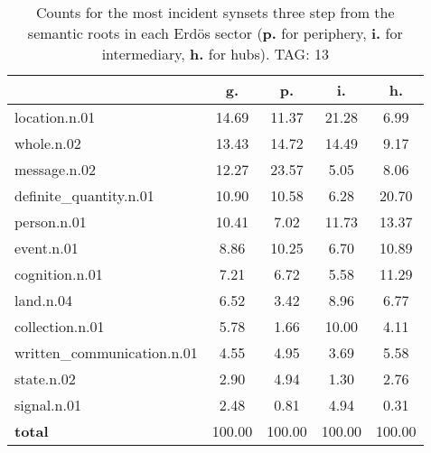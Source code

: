 \begin{table}[h!]
\begin{center}
\begin{tabular}{| l || c | c | c | c |}\hline
 & {\bf g.} & {\bf p.} & {\bf i.} & {\bf h.} \\\hline\hline
location.n.01 & 14.69  & 11.37  & 21.28  & 6.99 \\\hline
whole.n.02 & 13.43  & 14.72  & 14.49  & 9.17 \\\hline
message.n.02 & 12.27  & 23.57  & 5.05  & 8.06 \\\hline
definite\_quantity.n.01 & 10.90  & 10.58  & 6.28  & 20.70 \\\hline
person.n.01 & 10.41  & 7.02  & 11.73  & 13.37 \\\hline
event.n.01 & 8.86  & 10.25  & 6.70  & 10.89 \\\hline
cognition.n.01 & 7.21  & 6.72  & 5.58  & 11.29 \\\hline
land.n.04 & 6.52  & 3.42  & 8.96  & 6.77 \\\hline
collection.n.01 & 5.78  & 1.66  & 10.00  & 4.11 \\\hline
written\_communication.n.01 & 4.55  & 4.95  & 3.69  & 5.58 \\\hline
state.n.02 & 2.90  & 4.94  & 1.30  & 2.76 \\\hline
signal.n.01 & 2.48  & 0.81  & 4.94  & 0.31 \\\hline\hline
{{\bf total}} & 100.00  & 100.00  & 100.00  & 100.00 \\\hline
\end{tabular}
\caption{Counts for the most incident synsets three step from the semantic roots in each Erd\"os sector ({\bf p.} for periphery, {\bf i.} for intermediary, {\bf h.} for hubs). TAG: 13}
\end{center}
\end{table}